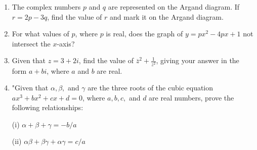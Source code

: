 \documentclass{article}
\begin{document}
\begin{enumerate}
\vspace{3cm}
\item The complex numbers \( p \) and \( q \) are represented on the Argand diagram. If \( r = 2p - 3q \), find the value of \( r \) and mark it on the Argand diagram.
\vspace{3cm}
\item For what values of \( p \), where \( p \) is real, does the graph of \( y = px^2 - 4px + 1 \) not intersect the \( x \)-axis?
\vspace{3cm}
\item Given that \( z = 3 + 2i \), find the value of \( \overline{z}^2 + \frac{1}{z^2} \), giving your answer in the form \( a + bi \), where \( a \) and \( b \) are real.
\vspace{3cm}
\item "Given that \( \alpha, \beta, \) and \( \gamma \) are the three roots of the cubic equation \( ax^3 + bx^2 + cx + d = 0 \), where \( a, b, c, \) and \( d \) are real numbers, prove the following relationships:

(i) \(\alpha + \beta + \gamma = -b/a\)

(ii) \(\alpha\beta + \beta\gamma + \alpha\gamma = c/a\)


\end{enumerate}
\end{document}

